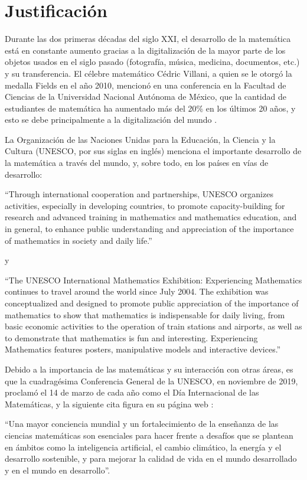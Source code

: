 
\section{Justificación}

Durante las dos primeras décadas del siglo XXI, el desarrollo de la matemática está en constante aumento gracias a la digitalización de la mayor parte de los objetos usados en el siglo pasado (fotografía, música, medicina, documentos, etc.) y su transferencia.  El célebre matemático Cédric Villani, a quien se le otorgó la medalla Fields en el año 2010, mencionó en una conferencia en la Facultad de Ciencias de la Universidad Nacional Autónoma de México, que la cantidad de estudiantes de matemática ha aumentado más del 20\% en los últimos 20 años, y esto se debe principalmente a la digitalización del mundo \cite{Villani2020}. 

    La Organización de las Naciones Unidas para la Educación, la Ciencia y la Cultura (UNESCO, por sus siglas en inglés) menciona \cite{UNESCO2020math} el importante desarrollo de la matemática a través del mundo, y, sobre todo, en los países en vías de desarrollo:
    
    “Through international cooperation and partnerships, UNESCO organizes activities, especially in developing countries, to promote capacity-building for research and advanced training in mathematics and mathematics education, and in general, to enhance public understanding and appreciation of the importance of mathematics in society and daily life.”

y

    “The UNESCO International Mathematics Exhibition: Experiencing Mathematics continues to travel around the world since July 2004. The exhibition was conceptualized and designed to promote public appreciation of the importance of mathematics to show that mathematics is indispensable for daily living, from basic economic activities to the operation of train stations and airports, as well as to demonstrate that mathematics is fun and interesting. Experiencing Mathematics features posters, manipulative models and interactive devices.”
    
Debido a la importancia de las matemáticas y su interacción con otras áreas, es que la cuadragésima Conferencia General de la UNESCO, en noviembre de 2019, proclamó el 14 de marzo de cada año como el Día Internacional de las Matemáticas, y la siguiente cita figura en su página web \cite{UNESCO2020IDM}: 

    “Una mayor conciencia mundial y un fortalecimiento de la enseñanza de las ciencias matemáticas son esenciales para hacer frente a desafíos que se plantean en ámbitos como la inteligencia artificial, el cambio climático, la energía y el desarrollo sostenible, y para mejorar la calidad de vida en el mundo desarrollado y en el mundo en desarrollo”. 

